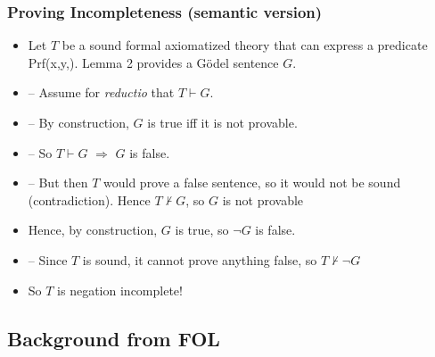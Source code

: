 \begin{frame}
\frametitle{Proving Incompleteness (semantic version)}

\begin{itemize}[<+->]

\item Let $T$ be a \textcolor{OGlyallpink}{sound} formal axiomatized theory that can express a predicate \textrm{Prf(x,y,)}. Lemma 2 provides a G\"odel sentence $G$. 

\item[] -- Assume for \textit{reductio} that $T \vdash G$. 
\item[] -- By construction, $G$ is true iff it is not provable. 
\item[] -- So $T \vdash G$ $\Rightarrow$ $G$ is false. 
\item[] -- But then $T$ would prove a false sentence, so it would not be sound (contradiction). Hence $T \nvdash G$, so $G$ is not provable

\item Hence, by construction, $G$ is true, so $\neg G$ is false.
\item[] -- Since $T$ is sound, it cannot prove anything false, so $T \nvdash \neg G$

\item So $T$ is negation incomplete!

\end{itemize}
\end{frame}


\subsection{Background from FOL}

